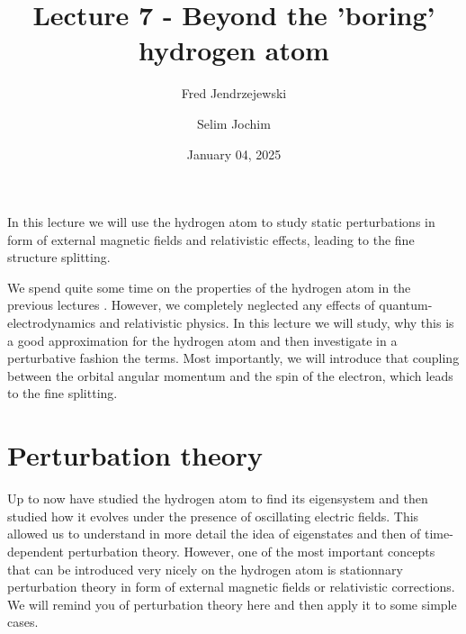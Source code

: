 \documentclass[10pt]{article}
\let\cite\citep
\renewenvironment{abstract}
  {{\bfseries\noindent{\abstractname}\par\nobreak}\footnotesize}
  {\bigskip}
\providecommand\citep{\cite}
\begin{document}
\title{Lecture 7 - Beyond the 'boring' hydrogen atom}



\author[1]{Fred Jendrzejewski}%
\author[2]{Selim Jochim}%
%
%


\vspace{-1em}



  
  \date{January 04, 2025}


\begingroup
\let\center\flushleft
\let\endcenter\endflushleft
\maketitle
\endgroup





\begin{abstract}
In this lecture we will use the hydrogen atom to study static perturbations in form of external magnetic fields  and relativistic effects, leading to the fine structure splitting.%
\end{abstract}%



\sloppy


We spend quite some time on the properties of the hydrogen atom in the previous lectures \cite{Jendrzejewski,atom}. However, we completely neglected any effects of quantum-electrodynamics and relativistic physics. In this lecture we will study, why this is a good approximation for the hydrogen atom and then investigate in a perturbative fashion the terms. Most importantly, we will introduce that coupling between the orbital angular momentum and the spin of the electron, which leads to the fine splitting.

\section{Perturbation theory}
Up to now have studied the hydrogen atom to find its eigensystem and then studied how it evolves under the presence of oscillating electric fields. This allowed us to understand in more detail the idea of eigenstates and then of time-dependent perturbation theory. However, one of the most important concepts that can be introduced very nicely on the hydrogen atom is stationnary perturbation theory in form of external magnetic fields or relativistic corrections. We will remind you of perturbation theory here and then apply it to some simple cases.
\end{document}
